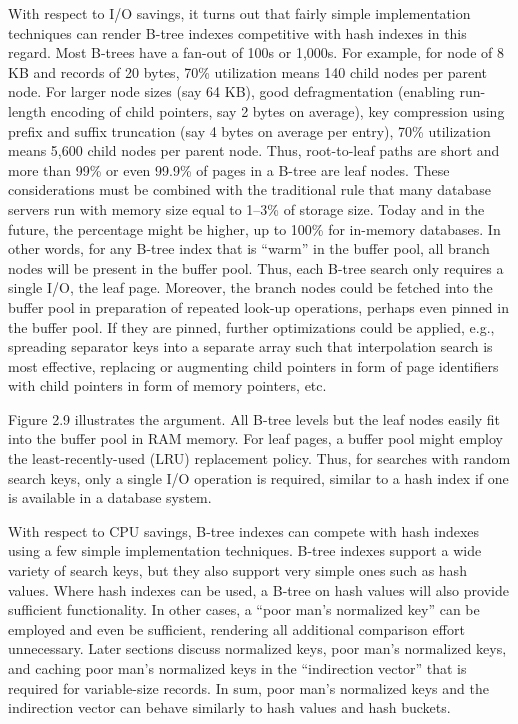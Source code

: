 With respect to I/O savings, it turns out that fairly simple
implementation techniques can render B-tree indexes competitive with
hash indexes in this regard. Most B-trees have a fan-out of 100s or
1,000s. For example, for node of 8 KB and records of 20 bytes, 70\%
utilization means 140 child nodes per parent node. For larger node sizes
(say 64 KB), good defragmentation (enabling run-length encoding of child
pointers, say 2 bytes on average), key compression using prefix and
suffix truncation (say 4 bytes on average per entry), 70\% utilization
means 5,600 child nodes per parent node. Thus, root-to-leaf paths are
short and more than 99\% or even 99.9\% of pages in a B-tree are leaf
nodes. These considerations must be combined with the traditional rule
that many database servers run with memory size equal to 1--3\% of
storage size. Today and in the future, the percentage might be higher,
up to 100\% for in-memory databases. In other words, for any B-tree
index that is ``warm'' in the buffer pool, all branch nodes will be
present in the buffer pool. Thus, each B-tree search only requires a
single I/O, the leaf page. Moreover, the branch nodes could be fetched
into the buffer pool in preparation of repeated look-up operations,
perhaps even pinned in the buffer pool. If they are pinned, further
optimizations could be applied, e.g., spreading separator keys into a
separate array such that interpolation search is most effective,
replacing or augmenting child pointers in form of page identifiers with
child pointers in form of memory pointers, etc.

Figure 2.9 illustrates the argument. All B-tree levels but the leaf
nodes easily fit into the buffer pool in RAM memory. For leaf pages, a
buffer pool might employ the least-recently-used (LRU) replacement
policy. Thus, for searches with random search keys, only a single I/O
operation is required, similar to a hash index if one is available in a
database system.

With respect to CPU savings, B-tree indexes can compete with hash
indexes using a few simple implementation techniques. B-tree indexes
support a wide variety of search keys, but they also support very simple
ones such as hash values. Where hash indexes can be used, a B-tree on
hash values will also provide sufficient functionality. In other cases,
a ``poor man's normalized key'' can be employed and even be sufficient,
rendering all additional comparison effort unnecessary. Later sections
discuss normalized keys, poor man's normalized keys, and caching poor
man's normalized keys in the ``indirection vector'' that is required for
variable-size records. In sum, poor man's normalized keys and the
indirection vector can behave similarly to hash values and hash buckets.


